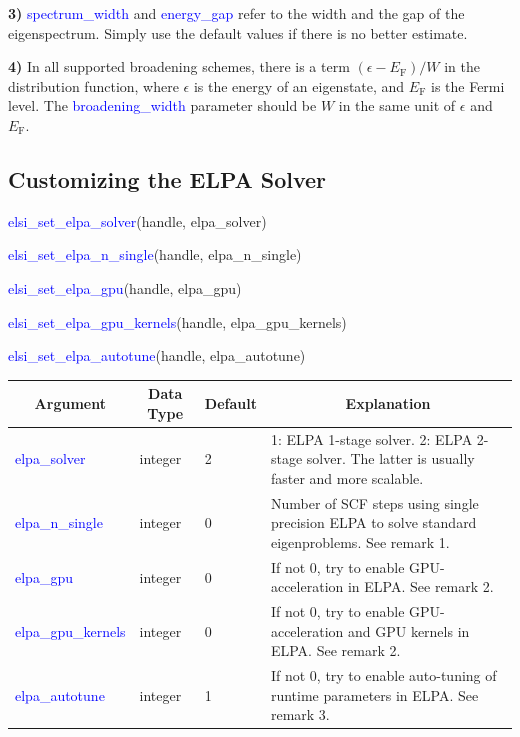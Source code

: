 \documentclass{report}
\begin{document}
\textbf{3)} \textcolor{blue}{spectrum\_width} and \textcolor{blue}{energy\_gap} refer to the width and the gap of the eigenspectrum.  Simply use the default values if there is no better estimate.

\textbf{4)} In all supported broadening schemes, there is a term $(\epsilon - E_\text{F})/W$ in the distribution function, where $\epsilon$ is the energy of an eigenstate, and $E_\text{F}$ is the Fermi level.  The \textcolor{blue}{broadening\_width} parameter should be $W$ in the same unit of $\epsilon$ and $E_\text{F}$.

\subsection{Customizing the ELPA Solver}
\label{subsec:setter_elpa}
\begin{labeling}{\hspace{6cm}}
\item [\hspace{0.3cm} \textcolor{blue}{elsi\_set\_elpa\_solver}(handle, elpa\_solver)]
\item [\hspace{0.3cm} \textcolor{blue}{elsi\_set\_elpa\_n\_single}(handle, elpa\_n\_single)]
\item [\hspace{0.3cm} \textcolor{blue}{elsi\_set\_elpa\_gpu}(handle, elpa\_gpu)]
\item [\hspace{0.3cm} \textcolor{blue}{elsi\_set\_elpa\_gpu\_kernels}(handle, elpa\_gpu\_kernels)]
\item [\hspace{0.3cm} \textcolor{blue}{elsi\_set\_elpa\_autotune}(handle, elpa\_autotune)]
\end{labeling}

\begin{tabular}[]{|p{30mm}|p{20mm}|p{15mm}|p{100mm}|}
\hline
\multicolumn{1}{|c|}{\textbf{Argument}} & \multicolumn{1}{c|}{\textbf{Data Type}} & \multicolumn{1}{c|}{\textbf{Default}} & \multicolumn{1}{c|}{\textbf{Explanation}}\\
\hline
\textcolor{blue}{elpa\_solver}       & integer & 2 & 1:  ELPA 1-stage solver.  2:  ELPA 2-stage solver.  The latter is usually faster and more scalable.\\
\hline
\textcolor{blue}{elpa\_n\_single}    & integer & 0 & Number of SCF steps using single precision ELPA to solve standard eigenproblems.  See remark 1.\\
\hline
\textcolor{blue}{elpa\_gpu}          & integer & 0 & If not 0, try to enable GPU-acceleration in ELPA.  See remark 2.\\
\hline
\textcolor{blue}{elpa\_gpu\_kernels} & integer & 0 & If not 0, try to enable GPU-acceleration and GPU kernels in ELPA.  See remark 2.\\
\hline
\textcolor{blue}{elpa\_autotune}     & integer & 1 & If not 0, try to enable auto-tuning of runtime parameters in ELPA.  See remark 3.\\
\hline
\end{tabular}
\end{document}
